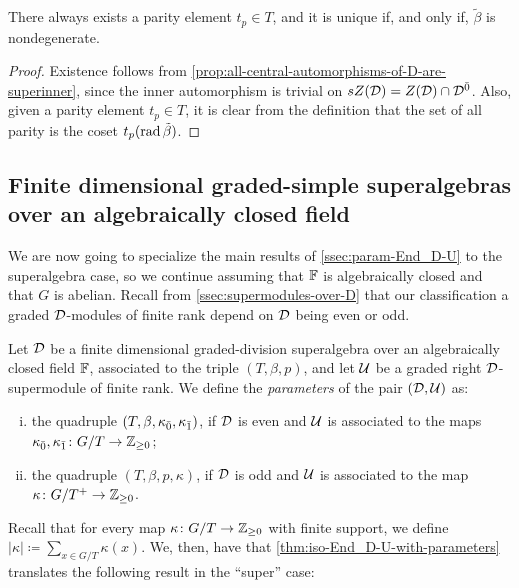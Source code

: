 \begin{cor}\label{cor:existence-parity-element}
    There always exists a parity element $t_p \in T$, and it is unique if, and only if, $\tilde\beta$ is nondegenerate.
\end{cor}

\begin{proof}
    Existence follows from \cref{prop:all-central-automorphisms-of-D-are-superinner}, since the inner automorphism is trivial on $sZ(\mathcal{D}) = Z(\mathcal{D}) \cap \mathcal{D}^{\bar0}$. 
    Also, given a parity element $t_p \in T$, it is clear from the definition that the set of all parity is the coset $t_p (\operatorname{rad} \tilde\beta)$.
\end{proof}

\subsection{Finite dimensional graded-simple superalgebras over an algebraically closed field}\label{ssec:classification-assc-super}

We are now going to specialize the main results of \cref{ssec:param-End_D-U} to the superalgebra case, so we continue assuming that $\mathbb{F}$ is algebraically closed and that $G$ is abelian. 
Recall from \cref{ssec:supermodules-over-D} that our classification a graded $\mathcal{D}$-modules of finite rank depend on $\mathcal{D}$ being even or odd.

\begin{defi}\label{def:E(D,U)-super}
    Let $\mathcal{D}$ be a finite dimensional graded-division superalgebra over an algebraically closed field $\mathbb{F}$, associated to the triple $(T, \beta, p)$, and let $\mathcal U$ be a graded right $\mathcal{D}$-supermodule of finite rank. 
    We define the \emph{parameters} of the pair $(\mathcal{D}, \mathcal U)$ as:
    \begin{enumerate}[(i)]
        \item the quadruple $(T, \beta, \kappa_{\bar{0}}, \kappa_{\bar{1}})$, if $\mathcal{D}$ is even and $\mathcal U$ is associated to the maps $\kappa_{\bar{0}}, \kappa_{\bar{1}} \colon G/T \to \mathbb{Z}_{\geq 0}$;
        \item the quadruple $(T, \beta, p, \kappa)$, if $\mathcal{D}$ is odd and $\mathcal U$ is associated to the map $\kappa\colon G/T^+ \to \mathbb{Z}_{\geq 0}$.
    \end{enumerate}
\end{defi}

Recall that for every map $\kappa\colon G/T\to \mathbb{Z}_{\geq 0}$ with finite support, we define $|\kappa| \coloneqq \sum_{x \in G/T} \kappa(x)$. 
We, then, have that  \cref{thm:iso-End_D-U-with-parameters} translates the following result in the ``super'' case:

